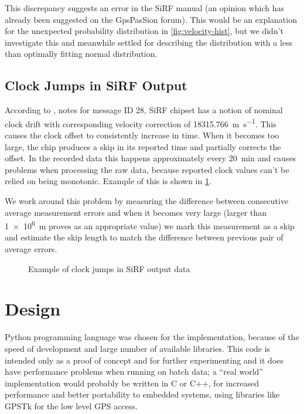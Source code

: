 This discrepancy suggests an error in the SiRF manual (an opinion which has already been
suggested on the GpsPasSion forum).
This would be an explanation for the unexpected probability distribution in
\cref{fig:velocity-hist}, but we didn't investigate this and meanwhile
settled for describing the distribution with a less than optimally fitting normal distribution.

\subsection{Clock Jumps in SiRF Output}
\label{sec:impl-sirf-jumps}
According to \cite{sirf-protocol}, notes for message ID 28, SiRF chipset has a
notion of nominal clock drift with corresponding velocity correction of \SI{18315.766}{\meter\per\second}.
This causes the clock offset to consistently increase in time.
When it becomes too large, the chip produces a skip in its reported time and
partially corrects the offset.
In the recorded data this happens approximately every \SI{20}{\minute} and causes
problems when processing the raw data, because reported clock values
can't be relied on being monotonic.
Example of this is shown in \cref{fig:impl-clock-jumps}.

We work around this problem by measuring the difference between consecutive average
measurement errors and when it becomes very large (larger than \SI{1e6}{\meter} proves as an
appropriate value) we mark this measurement as a skip and estimate the skip
length to match the difference between previous pair of average errors.

\begin{figure}[tp]
	\centering
	\caption{Example of clock jumps in SiRF output data}
	\label{fig:impl-clock-jumps}
\end{figure}

\section{Design}
Python programming language was chosen for the implementation,
because of the speed of development and large number of available libraries.
This code is intended only as a proof of
concept and for further experimenting and it does have performance problems
when running on batch data; a \enquote{real world} implementation
would probably be written in C or C++, for increased performance and better portability
to embedded systems, using libraries like GPSTk \cite{tolman04} for the low level GPS access.

